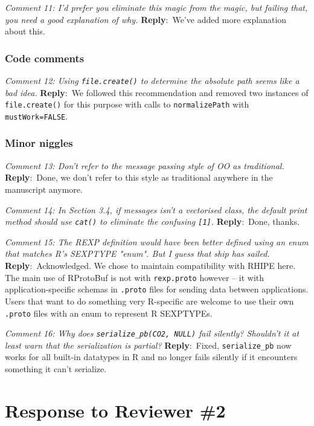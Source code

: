 \documentclass[10pt]{article}
\newcommand{\pointRaised}[2]{\smallskip %
  \textsl{{\fontseries{b}\selectfont #1}: #2}\newline}
\newcommand{\reply}[1]{\textbf{Reply}:\ #1 \smallskip } %
\begin{document}
\pointRaised{Comment 11}{
  I'd prefer you eliminate this magic from the magic, but failing that,
  you need a good explanation of why.}
\reply{We've added more explanation about this.}

\subsubsection*{Code comments}

\pointRaised{Comment 12}{Using \texttt{file.create()} to determine the absolute path seems like a bad idea.}
\reply{We followed this recommendation and removed two instances of
  \texttt{file.create()} for this purpose with calls to
  \texttt{normalizePath} with \texttt{mustWork=FALSE}.}

\subsubsection*{Minor niggles}

\pointRaised{Comment 13}{Don't refer to the message passing style of OO as traditional.}
\reply{Done, we don't refer to this style as traditional anywhere in
  the manuscript anymore.}

\pointRaised{Comment 14}{In Section 3.4, if messages isn't a vectorised class, the default
   print method should use \texttt{cat()} to eliminate the confusing \texttt{[1]}.}
\reply{Done, thanks.}

\pointRaised{Comment 15}{The REXP definition would have been better defined using an enum that
   matches R's SEXPTYPE "enum". But I guess that ship has sailed.}
\reply{Acknowledged.  We chose to maintain compatibility with RHIPE here.  The main
use of RProtoBuf is not with \texttt{rexp.proto} however -- it with
application-specific schemas in \texttt{.proto} files for sending data between
applications.  Users that want to do something very R-specific are
welcome to use their own \texttt{.proto} files with an enum to represent R SEXPTYPEs.}

\pointRaised{Comment 16}{Why does \texttt{serialize\_pb(CO2, NULL)} fail silently? Shouldn't it at least
   warn that the serialization is partial?}
\reply{Fixed, \texttt{serialize\_pb} now works for all built-in datatypes in R
  and no longer fails silently if it encounters something it can't serialize.}

\section*{Response to Reviewer \#2}
\end{document}
